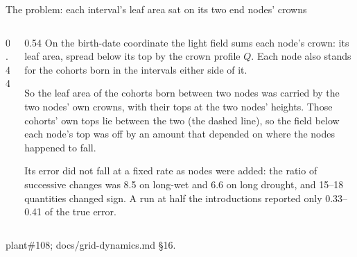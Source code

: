 \documentclass[aspectratio=169,10pt]{beamer}
\newcommand{\src}[1]{\par\vfill{\tiny\color{quiet} #1}}
\newcommand{\crown}[4]{\fill[accent!#4] (#1,#2) .. controls (#1+#3,#2-0.15) and (#1+0.7*#3,#2-0.75) .. (#1,#2-1.0)
  .. controls (#1-0.7*#3,#2-0.75) and (#1-#3,#2-0.15) .. (#1,#2);}
\newcommand{\stem}[2]{\draw[accent!60!black] (#1,#2-1.0) -- (#1,0);}
\begin{document}
\begin{frame}{The problem: each interval's leaf area sat on its two end nodes' crowns}
  \begin{columns}[T]
    \begin{column}{0.44\textwidth}
    \end{column}
    \begin{column}{0.54\textwidth}
      \small
      On the birth-date coordinate the light field sums each node's crown: its leaf area,
      spread below its top by the crown profile $Q$. Each node also stands for the cohorts born
      in the intervals either side of it.
      \medskip

      So the leaf area of the cohorts born between two nodes was carried by the two nodes' own
      crowns, with their tops at the two nodes' heights. Those cohorts' own tops lie between the
      two (the dashed line), so the field below each node's top was off by an amount that
      depended on where the nodes happened to fall.
      \medskip

      Its error did not fall at a fixed rate as nodes were added: the ratio of successive
      changes was 8.5 on long-wet and 6.6 on long drought, and 15--18 quantities changed sign.
      A run at half the introductions reported only 0.33--0.41 of the true error.
    \end{column}
  \end{columns}
  \src{plant\#108; docs/grid-dynamics.md \S16.}
\end{frame}
\end{document}
